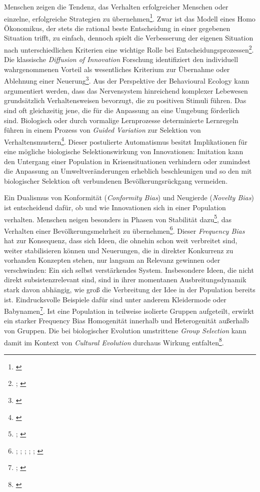 \documentclass[openany,twoside,twocolumn]{book}
\let\rmarkdownfootnote\footnote%
\def\footnote{\protect\rmarkdownfootnote}
\begin{document}
Menschen zeigen die Tendenz, das Verhalten erfolgreicher Menschen oder
einzelne, erfolgreiche Strategien zu übernehmen\footnote{\textcite{henrich_evolution_2003}}.
Zwar ist das Modell eines Homo Ökonomikus, der stets die rational beste
Entscheidung in einer gegebenen Situation trifft, zu einfach, dennoch
spielt die Verbesserung der eigenen Situation nach unterschiedlichen
Kriterien eine wichtige Rolle bei Entscheidungsprozessen\footnote{\textcite{mesoudi_cultural_2008};
  \textcite{mesoudi_experimental_2011}}. Die klassische \emph{Diffusion
of Innovation} Forschung identifiziert den individuell wahrgenommenen
Vorteil als wesentliches Kriterium zur Übernahme oder Ablehnung einer
Neuerung\footnote{\textcite{rogers_diffusion_1983}}. Aus der Perspektive
der Behavioural Ecology kann argumentiert werden, dass das Nervensystem
hinreichend komplexer Lebewesen grundsätzlich Verhaltensweisen
bevorzugt, die zu positiven Stimuli führen. Das sind oft gleichzeitig
jene, die für die Anpassung an eine Umgebung förderlich sind. Biologisch
oder durch vormalige Lernprozesse determinierte Lernregeln führen in
einem Prozess von \emph{Guided Variation} zur Selektion von
Verhaltensmustern\footnote{\textcite{smith_cultural_1992}}. Dieser
postulierte Automatismus besitzt Implikationen für eine mögliche
biologische Selektionswirkung von Innovationen: Imitation kann den
Untergang einer Population in Krisensituationen verhindern oder
zumindest die Anpassung an Umweltveränderungen erheblich beschleunigen
und so den mit biologischer Selektion oft verbundenen
Bevölkerungsrückgang vermeiden.

Ein Dualismus von Konformität (\emph{Conformity Bias}) und Neugierde
(\emph{Novelty Bias}) ist entscheidend dafür, ob und wie Innovationen
sich in einer Population verhalten. Menschen neigen besonders in Phasen
von Stabilität dazu\footnote{\textcite{henrich_evolution_1998};
  \textcite{kendal_evolution_2009}}, das Verhalten einer
Bevölkerungsmehrheit zu übernehmen\footnote{\textcite{bikhchandani_learning_1998};
  \textcite{efferson_conformists_2008};
  \textcite{giraldeau_social_1994}; \textcite{henrich_evolution_1998};
  \textcite{heinrich_why_2001}; \textcite{smith_conformity_1994}}.
Dieser \emph{Frequency Bias} hat zur Konsequenz, dass sich Ideen, die
ohnehin schon weit verbreitet sind, weiter stabilisieren können und
Neuerungen, die in direkter Konkurrenz zu vorhanden Konzepten stehen,
nur langsam an Relevanz gewinnen oder verschwinden: Ein sich selbst
verstärkendes System. Insbesondere Ideen, die nicht direkt
subsistenzrelevant sind, sind in ihrer momentanen Ausbreitungsdynamik
stark davon abhängig, wie groß die Verbreitung der Idee in der
Population bereits ist. Eindrucksvolle Beispiele dafür sind unter
anderem Kleidermode oder Babynamen\footnote{\textcite{acerbi_biases_2014};
  \textcite{acerbi_logic_2012}}. Ist eine Population in teilweise
isolierte Gruppen aufgeteilt, erwirkt ein starker Frequency Bias
Homogenität innerhalb und Heterogenität außerhalb von Gruppen. Die bei
biologischer Evolution umstrittene \emph{Group Selection} kann damit im
Kontext von \emph{Cultural Evolution} durchaus Wirkung
entfalten\footnote{\textcite{smith_cultural_1992}}.
\end{document}
